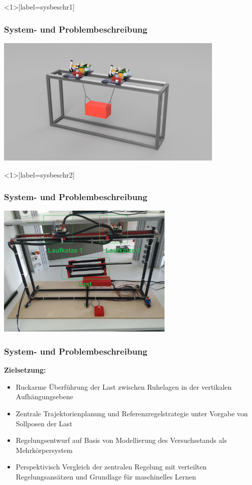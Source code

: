 \documentclass[
	ngerman,
	10pt,				%
	aspectratio=169 	%
]{beamer}
\begin{document}
\begin{frame}<1>[label=sysbeschr1]
	\frametitle{System- { und Problembeschreibung}}
	\begin{center}
		\includegraphics[width=110mm]{images/Veritas_demo_CAD}
	\end{center}

\end{frame}


\begin{frame}<1>[label=sysbeschr2]
	\frametitle{System- { und Problembeschreibung}}
	\begin{center}
		\includegraphics[width=85mm]{images/real_gantry}
	\end{center}
	
\end{frame}


\begin{frame}[label=sysbeschr3]
	\frametitle{System- und Problembeschreibung}
	\textbf{Zielsetzung:}
	\begin{itemize}
		\item Ruckarme Überführung der Last zwischen Ruhelagen in der vertikalen Aufhängungsebene
		\pause
		\item Zentrale Trajektorienplanung und Referenzregelstrategie unter Vorgabe von Sollposen der Last
		\pause
		\item Regelungsentwurf auf Basis von Modellierung des Versuchsstands als Mehrkörpersystem
		\pause  
		\item Perspektivisch Vergleich der zentralen Regelung mit verteilten Regelungsansätzen und Grundlage für maschinelles Lernen 
	\end{itemize}
\end{frame}
\end{document}
